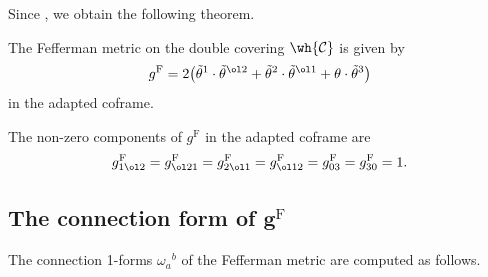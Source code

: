 Since , we obtain the following theorem.

\begin{Theorem}\label{Fefferman-metric}
The Fefferman metric on the double covering $\wh{\mathcal{C}}$ %
is given by
\[
g^{\mathrm{F}}=2\bigl(\tilde\theta^1\cdot\tilde\theta^{\ol2}+\tilde\theta^2\cdot\tilde\theta^{\ol1}+\theta\cdot \tilde\theta^3\bigr)
\]
in the adapted coframe.
\end{Theorem}

The non-zero components of $g^{\mathrm{F}}$ in the adapted coframe  are
\begin{equation}\label{metric-tensor}
g^{\mathrm{F}}_{1\ol2}=g^{\mathrm{F}}_{\ol2 1}=g^{\mathrm{F}}_{2\ol1}=g^{\mathrm{F}}_{\ol1 2}=g^{\mathrm{F}}_{03}=g^{\mathrm{F}}_{30}=1.
\end{equation}

\subsection[The connection form of g\^{}F]{The connection form of $\boldsymbol{g^{\mathrm{F}}}$}
The connection 1-forms $\omega_a{}^b$ of the Fefferman metric are computed as follows.

